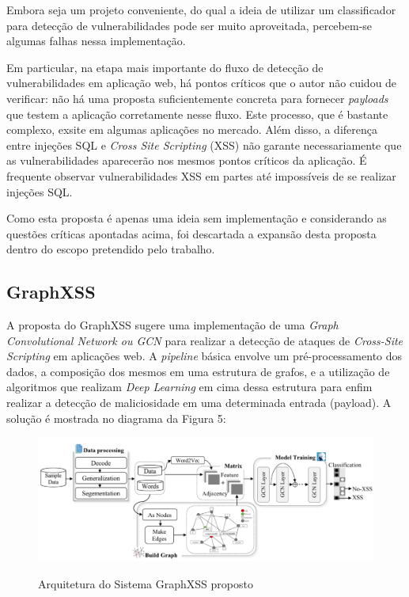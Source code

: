 Embora seja um projeto conveniente, do qual a ideia de utilizar um classificador para detecção de vulnerabilidades pode ser muito aproveitada,  percebem-se algumas falhas nessa implementação. 

Em particular, na etapa mais importante do fluxo de detecção de vulnerabilidades em aplicação web, há pontos críticos que o autor não cuidou de verificar: não há uma proposta suficientemente concreta para fornecer \textit{payloads} que testem a aplicação corretamente nesse fluxo. Este processo, que é bastante complexo, exsite em algumas aplicações no mercado. Além disso, a diferença entre injeções SQL e \textit{Cross Site Scripting} (XSS) não garante necessariamente  que as vulnerabilidades aparecerão nos mesmos pontos críticos da aplicação. É frequente observar vulnerabilidades XSS em partes até impossíveis de se realizar injeções SQL.

Como esta proposta é apenas uma ideia sem implementação e considerando as questões críticas apontadas acima, foi descartada a expansão desta proposta dentro do escopo pretendido pelo trabalho.

\subsection{GraphXSS}
A proposta do GraphXSS \cite{liu_graphxss_2022} sugere uma implementação de uma \textit{Graph Convolutional Network ou GCN} para realizar a detecção de ataques de \textit{Cross-Site Scripting} em aplicações web. A \textit{pipeline} básica envolve um pré-processamento dos dados, a composição dos mesmos em uma estrutura de grafos, e a utilização de algoritmos que realizam \textit{Deep Learning} em cima dessa estrutura para enfim realizar a detecção de maliciosidade em uma determinada entrada (payload). A solução é mostrada no diagrama da Figura 5: 

\begin{figure}[H]
    \centering
    \caption{Arquitetura do Sistema GraphXSS proposto}
    \includegraphics[width=14cm]{figuras/graphXSS.png} 
    \label{fig:internet} 
\end{figure}

